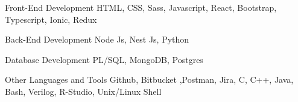 \newcommand{\Csh}{C{\lserif\#}}



\begin{cvskills}




\cvskill
{Front-End Development} %
{HTML, CSS, Sass, Javascript, React, Bootstrap, Typescript, Ionic, Redux} %


\cvskill
{Back-End Development} %
{Node Js, Nest Js, Python} %


\cvskill
{Database Development} %
{PL/SQL, MongoDB, Postgres} %











\cvskill
{Other Languages and Tools} %
{Github, Bitbucket ,Postman, Jira, C, C++, Java, Bash, Verilog, R-Studio, Unix/Linux Shell} %


\end{cvskills}